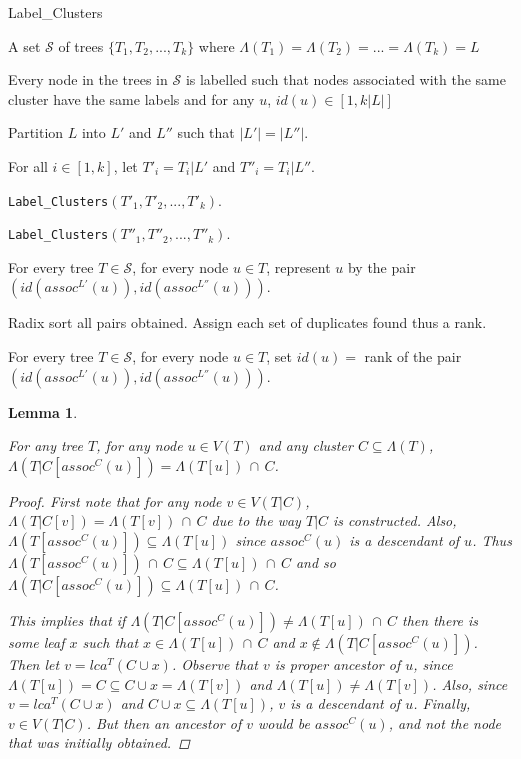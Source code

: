 \documentclass{article}
\newcommand{\leafset}{\Lambda}
\newtheorem{assocnode}[incompatibility]{Lemma}
\begin{document}
    \begin{algorithm}
        \caption{Label\_Clusters}
        \label{alg:labelclusters}

        \begin{algorithmic}[1]
            \Input A set $\mathcal{S}$ of trees $\{T_1, T_2, ..., T_k\}$ where $\leafset(T_1) = \leafset(T_2) = ... = \leafset(T_k) = L$

            \Output Every node in the trees in $\mathcal{S}$ is labelled such that nodes associated with the same cluster have the same labels and for any $u$, $id(u) \in [1, k |L|]$

            \State Partition $L$ into $L'$ and $L''$ such that $|L'| = |L''|$.

            \State For all $i \in [1,k]$, let $T'_i = T_i|L'$ and $T''_i = T_i|L''$.

            \State \texttt{Label\_Clusters}$(T'_1, T'_2, ..., T'_k)$.

            \State \texttt{Label\_Clusters}$(T''_1, T''_2, ..., T''_k)$.

            \State For every tree $T \in \mathcal{S}$, for every node $u \in T$, represent $u$ by the pair $(id(assoc^{L'}(u)), id(assoc^{L''}(u)))$.

            \State Radix sort all pairs obtained. Assign each set of duplicates found thus a rank.

            \State For every tree $T \in \mathcal{S}$, for every node $u \in T$, set $id(u) = $ rank of the pair $(id(assoc^{L'}(u)), id(assoc^{L''}(u)))$.
        \end{algorithmic}
    \end{algorithm}

    \begin{assocnode}
        \label{lem:assocnode}

        For any tree $T$, for any node $u \in V(T)$ and any cluster $C \subseteq \leafset(T)$, $\leafset(T|C[assoc^C(u)]) = \leafset(T[u])\, \cap\, C$.

        \begin{proof}
            First note that for any node $v \in V(T|C)$, $\leafset(T|C[v]) = \leafset(T[v])\, \cap\, C$ due to the way $T|C$ is constructed. Also, $\leafset(T[assoc^C(u)]) \subseteq \leafset(T[u])$ since $assoc^C(u)$ is a descendant of $u$. Thus $\leafset(T[assoc^C(u)])\, \cap\, C \subseteq \leafset(T[u])\, \cap\, C$ and so $\leafset(T|C[assoc^C(u)]) \subseteq \leafset(T[u])\, \cap\, C$.

            This implies that if $\leafset(T|C[assoc^C(u)]) \neq \leafset(T[u])\, \cap\, C$ then there is some leaf $x$ such that $x \in \leafset(T[u])\, \cap\, C$ and $x \not\in \leafset(T|C[assoc^C(u)])$. Then let $v = lca^T(C \cup x)$. Observe that $v$ is proper ancestor of $u$, since $\leafset(T[u]) = C \subseteq C \cup x = \leafset(T[v])$ and $\leafset(T[u]) \neq \leafset(T[v])$. Also, since $v = lca^T(C \cup x)$ and $C \cup x \subseteq \leafset(T[u])$, $v$ is a descendant of $u$. Finally, $v \in V(T|C)$. But then an ancestor of $v$ would be $assoc^C(u)$, and not the node that was initially obtained.
        \end{proof}
    \end{assocnode}
\end{document}
